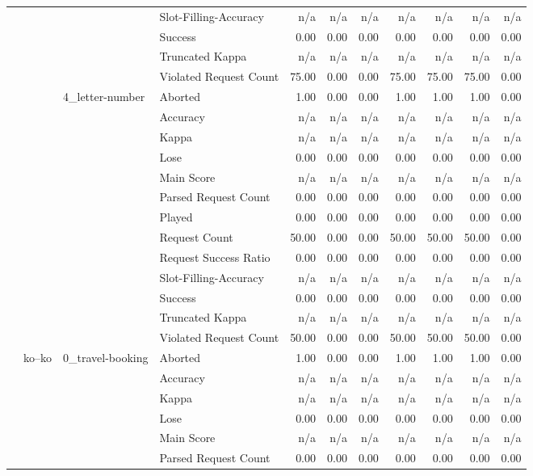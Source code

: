 \begin{tabular}{llllrrrrrrr}
 &  &  & Slot-Filling-Accuracy & n/a & n/a & n/a & n/a & n/a & n/a & n/a \\
 &  &  & Success & 0.00 & 0.00 & 0.00 & 0.00 & 0.00 & 0.00 & 0.00 \\
 &  &  & Truncated Kappa & n/a & n/a & n/a & n/a & n/a & n/a & n/a \\
 &  &  & Violated Request Count & 75.00 & 0.00 & 0.00 & 75.00 & 75.00 & 75.00 & 0.00 \\
\cline{3-11}
 &  & \multirow[t]{13}{*}{4_letter-number} & Aborted & 1.00 & 0.00 & 0.00 & 1.00 & 1.00 & 1.00 & 0.00 \\
 &  &  & Accuracy & n/a & n/a & n/a & n/a & n/a & n/a & n/a \\
 &  &  & Kappa & n/a & n/a & n/a & n/a & n/a & n/a & n/a \\
 &  &  & Lose & 0.00 & 0.00 & 0.00 & 0.00 & 0.00 & 0.00 & 0.00 \\
 &  &  & Main Score & n/a & n/a & n/a & n/a & n/a & n/a & n/a \\
 &  &  & Parsed Request Count & 0.00 & 0.00 & 0.00 & 0.00 & 0.00 & 0.00 & 0.00 \\
 &  &  & Played & 0.00 & 0.00 & 0.00 & 0.00 & 0.00 & 0.00 & 0.00 \\
 &  &  & Request Count & 50.00 & 0.00 & 0.00 & 50.00 & 50.00 & 50.00 & 0.00 \\
 &  &  & Request Success Ratio & 0.00 & 0.00 & 0.00 & 0.00 & 0.00 & 0.00 & 0.00 \\
 &  &  & Slot-Filling-Accuracy & n/a & n/a & n/a & n/a & n/a & n/a & n/a \\
 &  &  & Success & 0.00 & 0.00 & 0.00 & 0.00 & 0.00 & 0.00 & 0.00 \\
 &  &  & Truncated Kappa & n/a & n/a & n/a & n/a & n/a & n/a & n/a \\
 &  &  & Violated Request Count & 50.00 & 0.00 & 0.00 & 50.00 & 50.00 & 50.00 & 0.00 \\
\cline{2-11} \cline{3-11}
 & \multirow[t]{65}{*}{ko--ko} & \multirow[t]{13}{*}{0_travel-booking} & Aborted & 1.00 & 0.00 & 0.00 & 1.00 & 1.00 & 1.00 & 0.00 \\
 &  &  & Accuracy & n/a & n/a & n/a & n/a & n/a & n/a & n/a \\
 &  &  & Kappa & n/a & n/a & n/a & n/a & n/a & n/a & n/a \\
 &  &  & Lose & 0.00 & 0.00 & 0.00 & 0.00 & 0.00 & 0.00 & 0.00 \\
 &  &  & Main Score & n/a & n/a & n/a & n/a & n/a & n/a & n/a \\
 &  &  & Parsed Request Count & 0.00 & 0.00 & 0.00 & 0.00 & 0.00 & 0.00 & 0.00 \\

\end{tabular}
